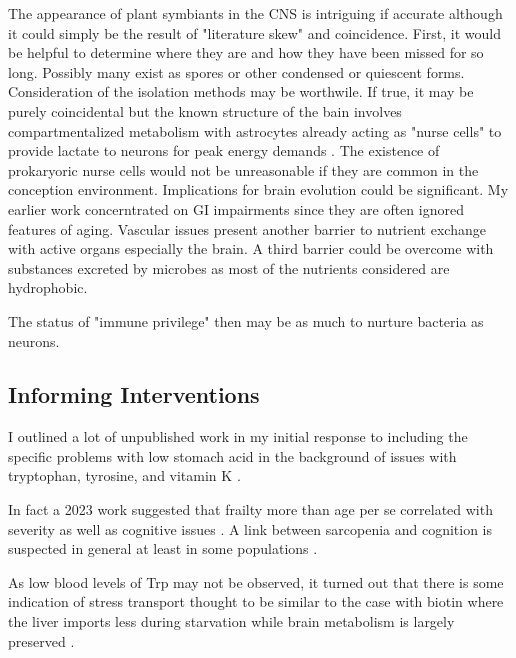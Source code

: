 \documentclass[aps,secnumarabic,balancelastpage,amsmath,amssymb,nofootinbib]{revtex4}
\begin{document}
The appearance of plant symbiants in the CNS is
intriguing if accurate although it could simply
be the result of "literature skew" and coincidence.
First, it would be helpful
to determine where they are and how they have been
missed for so long. Possibly many exist as spores or 
other condensed or quiescent forms. Consideration of the
isolation methods may be worthwile. If true, it may 
be purely coincidental but the known structure of the bain
involves compartmentalized metabolism with astrocytes
already acting as "nurse cells" to provide lactate
to neurons for peak energy demands
\cite{PMID12742077}. The existence of prokaryoric nurse
cells would not be unreasonable if they are common in 
the conception environment. Implications for brain
evolution could be significant.  
My earlier work concerntrated on GI impairments since
they are often ignored features of aging. Vascular
issues present another barrier to nutrient exchange with
active organs especially the brain. A third barrier could
be overcome with substances excreted by microbes as
most of the nutrients considered are hydrophobic.  

The status of "immune privilege" \cite{Proulx_Engelhardt_Central_nervous_system_zoning_2022}
 then may be as much
to nurture bacteria as neurons. 


\subsection{Informing Interventions   }


I outlined a lot of unpublished work in my initial
response to \mjmdisease including the
specific problems with low stomach acid
in the background of issues with tryptophan, tyrosine, and
vitamin K 
\cite{mmarchywka-MJM-2020-002-0.10}.

In fact a 2023 work suggested that frailty more
than age per se correlated with \mjmdisease severity
as well as cognitive issues
\cite{Matsumoto_Shibata_Kishi_Long_COVID_hypertension_2023}.
A link between sarcopenia and cognition is suspected
in general at least in some populations
\cite{PMC9965467}.

As low blood levels of Trp may not be observed,
it turned out that there is some indication of
stress transport
\cite{ mmarchywka-MJM-2021-007-.1-table-rg}
thought to be similar to the case with biotin
where the liver imports less during starvation while
brain metabolism is largely preserved
\cite{PachecoAlvarez_SolorzanoVargas_Gravel_Paradoxical_Regulation_Biotin_2004}.
\end{document}
